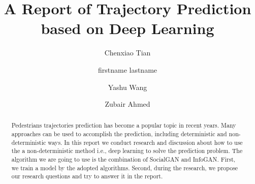 \documentclass[sigconf]{acmart}
\begin{document}
\title{A Report of Trajectory Prediction based on Deep Learning}


\author{Chenxiao Tian}

\author{firstname lastname}
\affiliation{\institution{}}

\author{Yashu Wang}

\author{Zubair Ahmed}
\affiliation{\institution{}}

\renewcommand{\shortauthors}{team 4: Trajectory Prediction}







\begin{abstract}

Pedestrians trajectories prediction has become a popular topic in recent years. Many approaches can be used to accomplish the prediction, including deterministic and non-deterministic ways. In this report we conduct research and discussion about how to use the a non-deterministic method i.e., deep learning to solve the prediction problem. The algorithm we are going to use is the combination of SocialGAN and InfoGAN. First, we train a model by the adopted algorithms. Second, during the research, we propose our research questions and try to answer it in the report.
\end{abstract}
\end{document}
